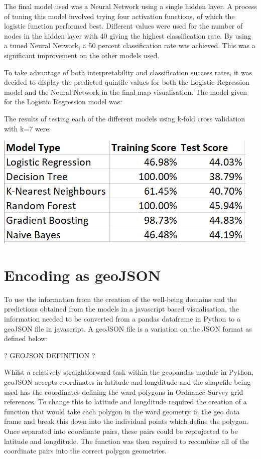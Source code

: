 The final model used was a Neural Network using a single hidden layer. A process of tuning this model involved trying four activation functions, of which the logistic function performed best. Different values were used for the number of nodes in the hidden layer with 40 giving the highest classification rate.
By using a tuned Neural Network, a 50 percent classification rate was achieved. This was a significant improvement on the other models used.

To take advantage of both interpretability and classification success rates, it was decided to display the predicted quintile values for both the Logistic Regression model and the Neural Network in the final map visualisation. The model given for the Logistic Regression model was:

The results of testing each of the different models using k-fold cross validation with k=7 were:

\includegraphics[scale=1]{figures/classification_results} %


\section{Encoding as geoJSON}

To use the information from the creation of the well-being domains and the predictions obtained from the models in a javascript based visualisation, the information needed to be converted from a pandas dataframe in Python to a geoJSON file in javascript. A geoJSON file is a variation on the JSON format as defined below:

? GEOJSON DEFINITION ?

Whilst a relatively straightforward task within the geopandas module in Python, geoJSON accepts coordinates in latitude and longditude and the shapefile being used has the coordinates defining the ward polygons in Ordnance Survey grid references. To change this to latitude and longditude required the creation of a function that would take each polygon in the ward geometry in the geo data frame and break this down into the individual points which define the polygon. Once separated into coordinate pairs, these pairs could be reprojected to be latitude and longditude. The function was then required to recombine all of the coordinate pairs into the correct polygon geometries.

